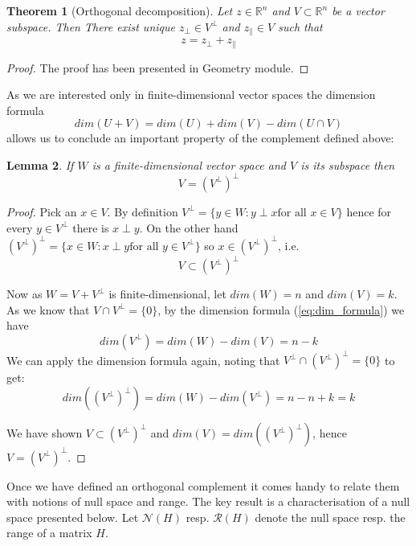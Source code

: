 \documentclass[a4paper]{article}
\theoremstyle{break}
\newtheorem{theorem}{Theorem}[section]
\newtheorem{lemma}[theorem]{Lemma}
\newcommand{\R}{\mathbb{R}}
\newcommand{\Nu}{\mathcal{N}}
\newcommand{\Ra}{\mathcal{R}}
\newcommand{\pll}{\parallel}
\begin{document}
\begin{theorem}[Orthogonal decomposition] \label{thm:projection}
    Let $z \in \R^n$ and $V \subset \R^n$ be a vector subspace. Then
    There exist unique $z_\perp \in V^\perp$ and $z_\pll \in V$ such that  
    \begin{equation}
        z = z_\perp + z_\pll
    \end{equation}
\end{theorem}

\begin{proof}
    The proof has been presented in Geometry module.
\end{proof}

As we are interested only in finite-dimensional vector spaces the dimension formula
\begin{equation}\label{eq:dim_formula}
    dim(U + V) = dim(U) + dim(V) - dim( U \cap V)
\end{equation}
allows us to conclude an important property of the complement defined above:

\begin{lemma}\label{lem:double_perp}
    If $W$ is a finite-dimensional vector space and $V$ is its subspace then
    $$ V = (V^\perp)^\perp $$
\end{lemma}

\begin{proof}
    Pick an $x \in V$. By definition $ V^\perp = \{ y \in W : y \perp x \text{for all } x \in V \}$ hence for every $y \in V^\perp $ there is $x \perp y$. On the other hand $ (V^\perp)^\perp = \{ x \in W : x \perp y \text{for all } y \in V^\perp \}$ so $x \in (V^\perp)^\perp$, i.e.
    $$ V \subset (V^\perp)^\perp$$

    Now as $W = V + V^\perp$ is finite-dimensional, let $dim(W) = n$ and $dim(V) = k$. 
    As we know that $V \cap V^\perp = \{0\}$, by the dimension formula (\ref{eq:dim_formula}) we have
    $$ dim(V^\perp) = dim(W) - dim(V) = n - k $$
    We can apply the dimension formula again, noting that $ V^\perp \cap (V^\perp)^\perp = \{0\} $ to get:
    $$ dim((V^\perp)^\perp) = dim(W) - dim(V^\perp) = n - n + k = k $$

    We have shown $ V \subset (V^\perp)^\perp$ and $ dim(V) = dim((V^\perp)^\perp)$,
    hence $ V = (V^\perp)^\perp$.
\end{proof}

Once we have defined an orthogonal complement it comes handy to relate them with notions of null space and range.
The key result is a characterisation of a null space presented below.
Let $\Nu(H)$ resp. $\Ra(H)$ denote the null space resp. the range of a matrix $H$.
\end{document}
